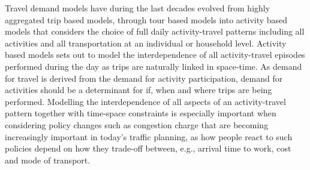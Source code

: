 

Travel demand models have during the last decades evolved from highly aggregated trip based models, through tour based models into activity based models that considers the choice of full daily activity-travel patterns including all activities and all transportation at an individual or household level. Activity based models sets out to model the interdependence of all activity-travel episodes performed during the day as trips are naturally linked in space-time. As demand for travel is derived from the demand for activity participation, demand for activities should be a determinant for if, when and where trips are being performed. Modelling the interdependence of all aspects of an activity-travel pattern together with time-space constraints is especially important when considering policy changes such as congestion charge that are becoming increasingly important in today's traffic planning, as how people react to such policies depend on how they trade-off between, e.g., arrival time to work, cost and mode of transport. 

